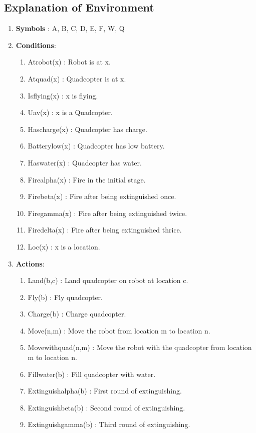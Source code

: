 \documentclass[12pt]{article}
\begin{document}
\subsection{Explanation of Environment}
\begin{enumerate}
    \item \textbf{Symbols} : A, B, C, D, E, F, W, Q
    
    \item \textbf{Conditions}:
    \begin{enumerate}
        \item Atrobot(x) : Robot is at x.
        \item Atquad(x) : Quadcopter is at x.
        \item Isflying(x) : x is flying.
        \item Uav(x) : x is a Quadcopter.
        \item Hascharge(x) : Quadcopter has charge.
        \item Batterylow(x) : Quadcopter has low battery.
        \item Haswater(x) : Quadcopter has water.
        \item Firealpha(x) : Fire in the initial stage.
        \item Firebeta(x) : Fire after being extinguished once.
        \item Firegamma(x) : Fire after being extinguished twice.
        \item Firedelta(x) : Fire after being extinguished thrice.
        \item Loc(x) : x is a location.
    \end{enumerate}
    
    \item \textbf{Actions}:
    \begin{enumerate}
        \item Land(b,c) : Land quadcopter on robot at location c.
        \item Fly(b) : Fly quadcopter.
        \item Charge(b) : Charge quadcopter.
        \item Move(n,m) : Move the robot from location m to location n.
        \item Movewithquad(n,m) : Move the robot with the quadcopter from location m to location n.
        \item Fillwater(b) : Fill quadcopter with water.
        \item Extinguishalpha(b) : First round of extinguishing.
        \item Extinguishbeta(b) : Second round of extinguishing.
        \item Extinguishgamma(b) : Third round of extinguishing.
    \end{enumerate}
\end{enumerate}
\end{document}
